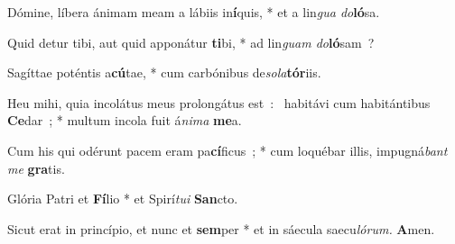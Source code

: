 \vs Dómine, líbera ánimam meam a lábiis in\textbf{í}quis, * et a lin\textit{gua do}\textbf{ló}sa.

\vs Quid detur tibi, aut quid apponátur \textbf{ti}bi, * ad lin\textit{guam do}\textbf{ló}sam~?

\vs Sagíttae poténtis a\textbf{cú}tae, * cum carbónibus de\textit{sola}\textbf{tór}iis.

\vs Heu mihi, quia incolátus meus prolongátus est~: \dag\ habitávi cum habitántibus \textbf{Ce}dar~; * 
multum incola fuit á\textit{nima} \textbf{me}a.

\vs Cum his qui odérunt pacem eram pa\textbf{cí}ficus~; * cum loquébar illis, impugná\textit{bant me} \textbf{gra}tis.

\vs Glória Patri et \textbf{Fí}lio * et Spirí\textit{tui} \textbf{San}cto.

\vs Sicut erat in princípio, et nunc et \textbf{sem}per * et in sáecula saecu\textit{lórum.} \textbf{A}men.

